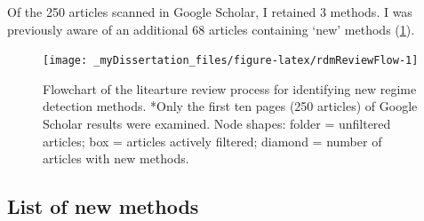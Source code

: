 \documentclass[12pt,twoside,openany]{reedthesis}
\begin{document}
Of the 250 articles scanned in Google Scholar, I retained 3 methods. I was previously aware of an additional 68 articles containing `new' methods (\ref{fig:rdmReviewFlow}).
\begin{figure}

{\centering \texttt{[image: \_myDissertation\_files/figure-latex/rdmReviewFlow-1]} 

}

\caption{Flowchart of the litearture review process for identifying new regime detection methods. *Only the first ten pages (250 articles) of Google Scholar results were examined. Node shapes: folder = unfiltered articles; box = articles actively filtered; diamond = number of articles with new methods.}\label{fig:rdmReviewFlow}
\end{figure}
\hypertarget{list-of-new-methods}{%
\subsection{List of new methods}\label{list-of-new-methods}}
\end{document}
